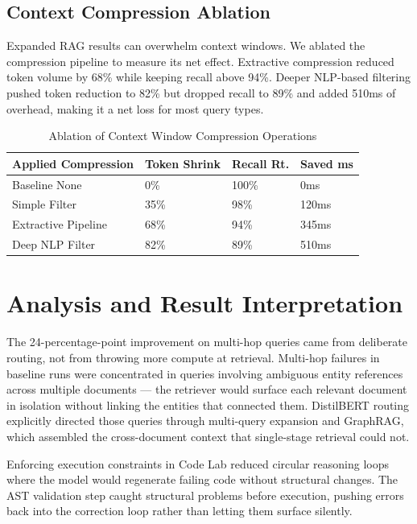 \documentclass[conference]{IEEEtran}
\begin{document}
\subsection{Context Compression Ablation}

Expanded RAG results can overwhelm context windows. We ablated the compression pipeline to measure its net effect. Extractive compression reduced token volume by 68\% while keeping recall above 94\%. Deeper NLP-based filtering pushed token reduction to 82\% but dropped recall to 89\% and added 510ms of overhead, making it a net loss for most query types.

\begin{table}[htbp]
\caption{Ablation of Context Window Compression Operations}
\begin{center}
\begin{tabularx}{\linewidth}{|l|Y|Y|Y|}
\hline
\textbf{Applied Compression} & \textbf{Token Shrink} & \textbf{Recall Rt.} & \textbf{Saved ms} \\
\hline
Baseline None & 0\% & 100\% & 0ms \\
Simple Filter & 35\% & 98\% & 120ms \\
Extractive Pipeline & 68\% & 94\% & 345ms \\
Deep NLP Filter & 82\% & 89\% & 510ms \\
\hline
\end{tabularx}
\label{tab:compression}
\end{center}
\end{table}

\section{Analysis and Result Interpretation}

The 24-percentage-point improvement on multi-hop queries came from deliberate routing, not from throwing more compute at retrieval. Multi-hop failures in baseline runs were concentrated in queries involving ambiguous entity references across multiple documents --- the retriever would surface each relevant document in isolation without linking the entities that connected them. DistilBERT routing explicitly directed those queries through multi-query expansion and GraphRAG, which assembled the cross-document context that single-stage retrieval could not.

Enforcing execution constraints in Code Lab reduced circular reasoning loops where the model would regenerate failing code without structural changes. The AST validation step caught structural problems before execution, pushing errors back into the correction loop rather than letting them surface silently.
\end{document}
